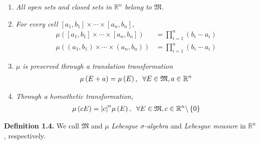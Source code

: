 \documentclass[a4paper]{article}
\numberwithin{equation}{section}
\begin{document}
\begin{enumerate}
\item \textit{All open sets and closed sets in $\mathbb{R}^n$ belong to $\mathfrak{M}$.}
\item \textit{For every cell $\left[ {{a_1},{b_1}} \right] \times  \cdots  \times \left[ {{a_n},{b_n}} \right]$,}
\begin{align}
\mu \left( {\left[ {{a_1},{b_1}} \right] \times  \cdots  \times \left[ {{a_n},{b_n}} \right]} \right) &= \prod\limits_{i = 1}^n {\left( {{b_i} - {a_i}} \right)} \\
\mu \left( {\left( {{a_1},{b_1}} \right) \times  \cdots  \times \left( {{a_n},{b_n}} \right)} \right) &= \prod\limits_{i = 1}^n {\left( {{b_i} - {a_i}} \right)} 
\end{align}
\item \textit{$\mu$ is preserved through a translation transformation}
\begin{align}
\mu \left( {E + a} \right) = \mu \left( E \right),\hspace{0.2cm}\forall E \in \mathfrak{M},a \in {\mathbb{R}^n}
\end{align}
\item \textit{Through a homothetic transformation,}
\begin{align}
\mu \left( {cE} \right) = {\left| c \right|^n}\mu \left( E \right),\hspace{0.2cm}\forall E \in \mathfrak{M},c \in {\mathbb{R}^n}\backslash \left\{ 0 \right\}
\end{align}
\end{enumerate}
\textbf{Definition 1.4.} We call $\mathfrak{M}$ and $\mu$ \textit{Lebesgue $\sigma$-algebra} and \textit{Lebesgue measure} in $\mathbb{R}^n$, respectively.\\
\end{document}
